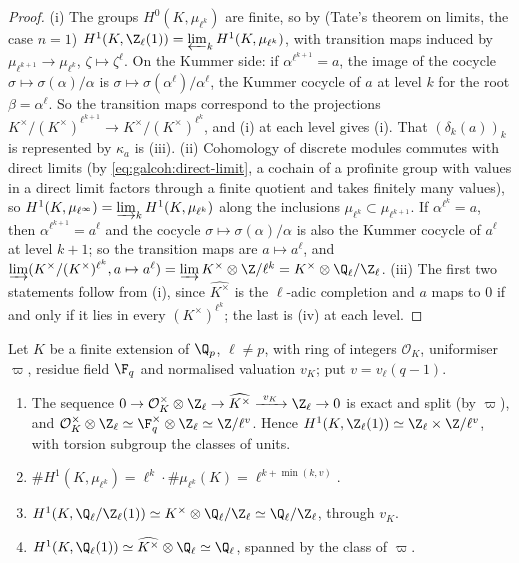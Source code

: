 \begin{proof}
(i) The groups $H^0(K,\mu_{\ell^k})$ are finite, so by  (Tate's theorem on limits, the case $n=1$)
$H^1(K,\Z_\ell(1))=\varprojlim_kH^1(K,\mu_{\ell^k})$, with transition maps induced by $\mu_{\ell^{k+1}}\to\mu_{\ell^k}$, $\zeta\mapsto\zeta^\ell$. On the Kummer side: if
$\alpha^{\ell^{k+1}}=a$, the image of the cocycle $\sigma\mapsto\sigma(\alpha)/\alpha$ is $\sigma\mapsto\sigma(\alpha^\ell)/\alpha^\ell$, the Kummer cocycle of $a$ at level $k$ for the root
$\beta=\alpha^\ell$. So the transition maps correspond to the projections $K^\times/(K^\times)^{\ell^{k+1}}\to K^\times/(K^\times)^{\ell^k}$, and (i) at
each level gives (i). That $(\delta_k(a))_k$ is represented by $\kappa_a$ is (iii).
(ii) Cohomology of discrete modules commutes with direct limits (by \eqref{eq:galcoh:direct-limit}, a cochain of a profinite group with values in a direct limit
factors through a finite quotient and takes finitely many values), so $H^1(K,\mu_{\ell^\infty})=\varinjlim_kH^1(K,\mu_{\ell^k})$ along the inclusions
$\mu_{\ell^k}\subset\mu_{\ell^{k+1}}$. If $\alpha^{\ell^k}=a$, then $\alpha^{\ell^{k+1}}=a^\ell$ and the cocycle $\sigma\mapsto\sigma(\alpha)/\alpha$ is also the Kummer cocycle of $a^\ell$
at level $k+1$; so the transition maps are $a\mapsto a^\ell$, and $\varinjlim(K^\times/(K^\times)^{\ell^k},a\mapsto a^\ell)=\varinjlim K^\times\otimes\Z/\ell^k=K^\times\otimes\Q_\ell/\Z_\ell$.
(iii) The first two statements follow from (i), since $\widehat{K^\times}$ is the $\ell$-adic completion and $a$ maps to $0$ if and only if it lies in every $(K^\times)^{\ell^k}$; the last
is (iv) at each level.
\end{proof}

\begin{proposition}\label{prop:galcoh:kummer-local}
Let $K$ be a finite extension of $\Q_p$, $\ell\ne p$, with ring of integers $\mathcal O_K$, uniformiser $\varpi$, residue field $\F_q$ and normalised valuation $v_K$; put
$v=v_\ell(q-1)$.
\begin{enumerate}[label=(\roman*)]
\item The sequence $0\to\mathcal O_K^\times\otimes\Z_\ell\to\widehat{K^\times}\xrightarrow{\ v_K\ }\Z_\ell\to0$ is exact and split (by $\varpi$), and
$\mathcal O_K^\times\otimes\Z_\ell\simeq\F_q^\times\otimes\Z_\ell\simeq\Z/\ell^v$. Hence $H^1(K,\Z_\ell(1))\simeq\Z_\ell\times\Z/\ell^v$, with torsion subgroup the classes of units.
\item $\#H^1(K,\mu_{\ell^k})=\ell^k\cdot\#\mu_{\ell^k}(K)=\ell^{k+\min(k,v)}$.
\item $H^1(K,\Q_\ell/\Z_\ell(1))\simeq K^\times\otimes\Q_\ell/\Z_\ell\simeq\Q_\ell/\Z_\ell$, through $v_K$.
\item $H^1(K,\Q_\ell(1))\simeq\widehat{K^\times}\otimes\Q_\ell\simeq\Q_\ell$, spanned by the class of $\varpi$.
\end{enumerate}
\end{proposition}

